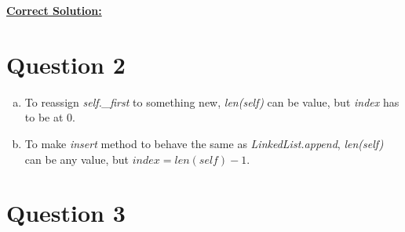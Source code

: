 \documentclass[12pt]{article}
\begin{document}
\begin{enumerate}[a.]
    \newpage

    \begin{mdframed}
        \underline{\textbf{Correct Solution:}}

        \bigskip

    \end{mdframed}

\end{enumerate}

\section*{Question 2}
\begin{enumerate}[a.]
    \item To reassign \textit{self.\_first} to something new, \textit{len(self)}
    can be value, but \textit{index} has to be at 0.

    \item To make \textit{insert} method to behave the same as \textit{LinkedList.append},
    \textit{len(self)} can be any value, but $index = len(self) - 1$.
\end{enumerate}


\section*{Question 3}
\end{document}
